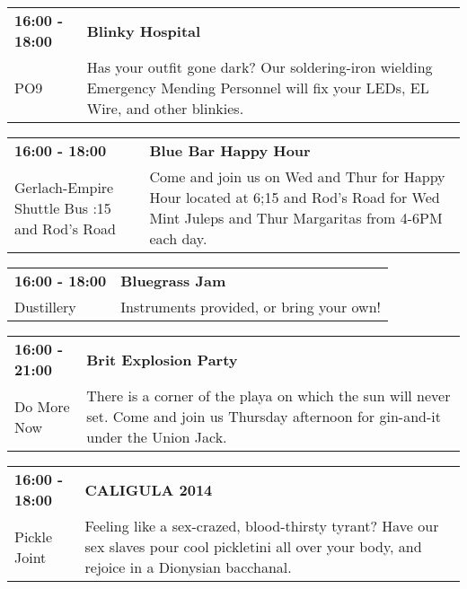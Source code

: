 \begin{tabular}{ p{1in} p{2.2in} }
    \textbf{16:00 - 18:00} & \textbf{Blinky Hospital} \\
    PO9 \newline  & Has your outfit gone dark?  Our soldering-iron wielding Emergency Mending Personnel will fix your LEDs, EL Wire, and other blinkies. \\
    \hline 
\end{tabular}
    
\begin{tabular}{ p{1in} p{2.2in} }
    \textbf{16:00 - 18:00} & \textbf{Blue Bar Happy Hour} \\
    Gerlach-Empire Shuttle Bus \newline 6:15 and Rod's Road & Come and join us on Wed and Thur for Happy Hour located at 6;15 and Rod's Road for Wed Mint Juleps and Thur Margaritas from 4-6PM each day. \\
    \hline 
\end{tabular}
    
\begin{tabular}{ p{1in} p{2.2in} }
    \textbf{16:00 - 18:00} & \textbf{Bluegrass Jam} \\
    Dustillery \newline  & Instruments provided, or bring your own! \\
    \hline 
\end{tabular}
    
\begin{tabular}{ p{1in} p{2.2in} }
    \textbf{16:00 - 21:00} & \textbf{Brit Explosion Party} \\
    Do More Now \newline  & There is a corner of the playa on which the sun will never set. Come and join us Thursday afternoon for gin-and-it under the Union Jack. \\
    \hline 
\end{tabular}
    
\begin{tabular}{ p{1in} p{2.2in} }
    \textbf{16:00 - 18:00} & \textbf{CALIGULA 2014} \\
    Pickle Joint \newline  & Feeling like a sex-crazed, blood-thirsty tyrant? Have our sex slaves pour cool pickletini all over your body, and rejoice in a Dionysian bacchanal. \\
    \hline 
\end{tabular}
    
